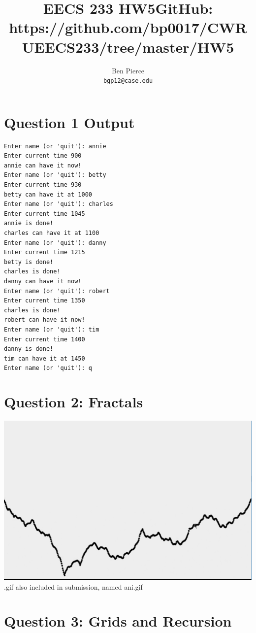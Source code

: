 \documentclass[12pt]{article} %
\title{EECS 233 HW5}
\author{Ben Pierce \\ \texttt{bgp12@case.edu}}
\begin{document}
\maketitle
\title {GitHub: https://github.com/bp0017/CWRUEECS233/tree/master/HW5} %
\section{Question 1 Output}
\begin{lstlisting}
Enter name (or 'quit'): annie
Enter current time 900
annie can have it now!
Enter name (or 'quit'): betty
Enter current time 930
betty can have it at 1000
Enter name (or 'quit'): charles
Enter current time 1045
annie is done!
charles can have it at 1100
Enter name (or 'quit'): danny
Enter current time 1215
betty is done!
charles is done!
danny can have it now!
Enter name (or 'quit'): robert
Enter current time 1350
charles is done!
robert can have it now!
Enter name (or 'quit'): tim
Enter current time 1400
danny is done!
tim can have it at 1450
Enter name (or 'quit'): q
\end{lstlisting}

\section{Question 2: Fractals}
\includegraphics[scale = 0.5]{Capture.png}\\
.gif also included in submission, named ani.gif

\section{Question 3: Grids and Recursion}
\end{document}
